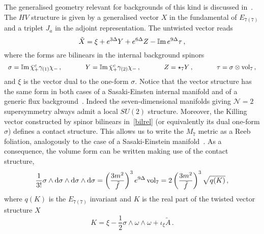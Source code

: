 \documentclass[debug]{phd}
\begin{document}
%
%
	The generalised geometry relevant for backgrounds of this kind is discussed in~\cite{AshmoreESE}. 
	The $HV$ structure is given by a generalised vector $X$ in the fundamental of $E_{7(7)}$ and a triplet $J_a$ in the adjoint representation. 
	The untwisted vector reads
		\begin{equation}
			\tilde{X}= \xi + e^{3\Delta} Y + e^{6\Delta} Z - \operatorname{\mathbb{I}m} e^{9\Delta} \tau\, ,
		\end{equation}	
where the forms are bilinears in the internal background spinors 
		\begin{equation}
		\label{bilrel}
			\begin{array}{lcccccr}
				\sigma = \operatorname{\mathbb{I}m} \bar{\chi}_+^c \gamma_{(1)} \chi_- \, , &\phantom{and}& Y = \operatorname{\mathbb{I}m} \bar{\chi}_+^c \gamma_{(2)} \chi_- \, ,&\phantom{and}& Z=\star_7 Y \, ,& \phantom{and}& \tau = \sigma \otimes \operatorname{vol}_7\, ,
			\end{array}
		\end{equation}
and $\xi$ is the vector dual to the one-form $\sigma$. 
Notice that the vector structure has the same form in both cases of a Sasaki-Einsten internal manifold and of a generic flux background~\cite{AshmoreESE}. 
Indeed the seven-dimensional manifolds giving $\mathcal{N}=2$ supersymmetry always admit a local $SU(2)$ structure. 
Moreover, the Killing vector constructed by spinor bilinears in~\eqref{bilrel} (or equivalently its dual one-form $\sigma$) defines a contact structure.
This allows us to write the $M_7$ metric as a Reeb foliation, analogously to the case of a Sasaki-Einstein manifold~\cite{Gabella:2012rc}. 
As a consequence, the volume form can be written making use of the contact structure,
		\begin{equation}
			\dfrac{1}{3!} \sigma \wedge \mathrm{d}  \sigma \wedge \mathrm{d}  \sigma \wedge \mathrm{d}  \sigma = \left(\dfrac{3m^2}{\tilde{f}}\right)^3 e^{9\Delta} \operatorname{vol}_7 = 2\left(\dfrac{3m^2}{\tilde{f}}\right)^3 \sqrt{q(K)}\, ,
		\end{equation}
where $q(K)$ is the $E_{7(7)}$ invariant and $K$ is the real part of the twisted vector structure $X$
		\begin{equation}
		\label{Kads4}
			K = \xi - \frac{1}{2} \sigma \wedge \omega \wedge \omega + \iota_\xi \tilde{A}\, .
		\end{equation}
\end{document}
